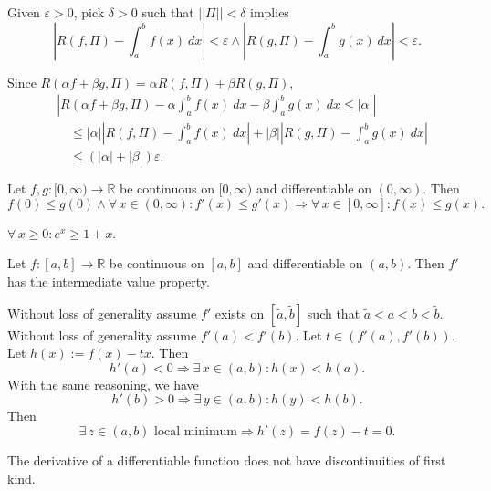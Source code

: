 \documentclass{notes}
\begin{document}
\begin{prf}
  Given $\varepsilon > 0$, pick $\delta > 0$ such that $|| \Pi || < \delta$ implies 
  \[
    \left | R(f, \Pi) - \int_a^b f(x)\ dx \right | < \varepsilon \land \left | R(g, \Pi) - \int_a^b g(x)\ dx \right | < \varepsilon.
  \]
  
  Since $R(\alpha f + \beta g, \Pi) = \alpha R(f, \Pi) + \beta R(g, \Pi)$, 
  \begin{align*}
    &\left | R(\alpha f + \beta g, \Pi) - \alpha \int_a^b f(x)\ dx - \beta \int_a^b g(x)\ dx \leq \left | \alpha \right | \right | \\ 
    &\quad \leq \left | \alpha \right | \left | R(f, \Pi) - \int_a^b f(x)\ dx \right | + \left | \beta \right | \left | R(g, \Pi) - \int_a^b g(x)\ dx \right | \\ 
    &\quad \leq (\left | \alpha \right | + \left | \beta \right |) \varepsilon.
  \end{align*}
\end{prf}

\begin{cor}
  Let $f, g: [0, \infty) \to \mathbb R$ be continuous on $[0, \infty)$ and differentiable on $(0, \infty)$.
  Then 
  \[
    f(0) \leq g(0) \land \forall \, x \in (0, \infty): f'(x) \leq g'(x) \Rightarrow \forall \, x \in [0, \infty]: f(x) \leq g(x).
  \]
\end{cor}

\begin{eg}
  $\forall \, x \geq 0: e^x \geq 1 + x$.
\end{eg}

\begin{lem}
  Let $f \colon [a, b] \to \mathbb R$ be continuous on $[a, b]$ and differentiable on $(a, b)$.
  Then $f'$ has the intermediate value property.
\end{lem}

\begin{prf}
  Without loss of generality assume $f'$ exists on $[\tilde a, \tilde b]$ such that $\tilde a < a < b < \tilde b$.
  Without loss of generality assume $f'(a) < f'(b)$.
  Let $t \in (f'(a), f'(b))$.
  Let $h(x) := f(x) - t x$.
  Then 
  \[
    h'(a) < 0 \Rightarrow \exists \, x \in (a, b): h(x) < h(a).
  \]
  With the same reasoning, we have 
  \[
    h'(b) > 0 \Rightarrow \exists \, y \in (a, b): h(y) < h(b).
  \]
  Then 
  \[
    \exists \, z \in (a, b) \text{ local minimum} \Rightarrow h'(z) = f(z) - t = 0.
  \]
\end{prf}

\begin{cor}
  The derivative of a differentiable function does not have discontinuities of first kind.
\end{cor}
\end{document}
